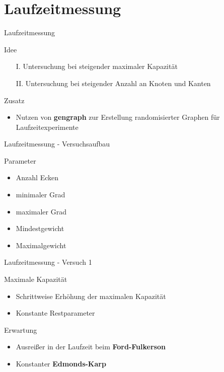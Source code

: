 \documentclass{beamer}
\begin{document}
    \section{Laufzeitmessung}
    \begin{frame}{Laufzeitmessung}
        \begin{block}{Idee}
            \begin{itemize}
                \item[I.] Untersuchung bei steigender maximaler Kapazit\"at
                \item[II.] Untersuchung bei steigender Anzahl an Knoten und Kanten
            \end{itemize}
        \end{block}

        \begin{block}{Zusatz}
            \begin{itemize}
                \item Nutzen von \textbf{gengraph} zur Erstellung randomisierter Graphen f\"ur Laufzeitexperimente
            \end{itemize}
        \end{block}
    \end{frame}

    \begin{frame}{Laufzeitmessung - Versuchsaufbau}
        \begin{block}{Parameter}
            \begin{itemize}
                \item Anzahl Ecken
                \item minimaler Grad
                \item maximaler Grad
                \item Mindestgewicht
                \item Maximalgewicht
            \end{itemize}
        \end{block}
    \end{frame}

    \begin{frame}{Laufzeitmessung - Versuch 1}
        \begin{block}{Maximale Kapazit\"at}
            \begin{itemize}
                \item Schrittweise Erh\"ohung der maximalen Kapazit\"at
                \item Konstante Restparameter
            \end{itemize}
        \end{block}

        \begin{block}{Erwartung}
            \begin{itemize}
                \item Ausrei\ss{}er in der Laufzeit beim \textbf{Ford-Fulkerson}
                \item Konstanter \textbf{Edmonds-Karp}
            \end{itemize}
        \end{block}
    \end{frame}
\end{document}
